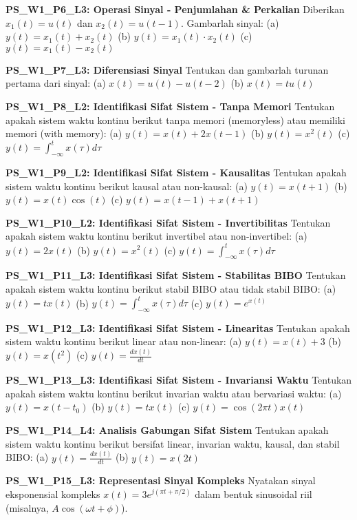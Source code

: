 \documentclass[
  letterpaper,
  DIV=11,
  numbers=noendperiod]{scrreprt}
\begin{document}
\textbf{PS\_W1\_P6\_L3: Operasi Sinyal - Penjumlahan \& Perkalian}
Diberikan \(x_1(t) = u(t)\) dan \(x_2(t) = u(t-1)\). Gambarlah sinyal:
(a) \(y(t) = x_1(t) + x_2(t)\) (b) \(y(t) = x_1(t) \cdot x_2(t)\) (c)
\(y(t) = x_1(t) - x_2(t)\)

\textbf{PS\_W1\_P7\_L3: Diferensiasi Sinyal} Tentukan dan gambarlah
turunan pertama dari sinyal: (a) \(x(t) = u(t) - u(t-2)\) (b)
\(x(t) = t u(t)\)

\textbf{PS\_W1\_P8\_L2: Identifikasi Sifat Sistem - Tanpa Memori}
Tentukan apakah sistem waktu kontinu berikut tanpa memori (memoryless)
atau memiliki memori (with memory): (a) \(y(t) = x(t) + 2x(t-1)\) (b)
\(y(t) = x^2(t)\) (c) \(y(t) = \int_{-\infty}^{t} x(\tau) d\tau\)

\textbf{PS\_W1\_P9\_L2: Identifikasi Sifat Sistem - Kausalitas} Tentukan
apakah sistem waktu kontinu berikut kausal atau non-kausal: (a)
\(y(t) = x(t+1)\) (b) \(y(t) = x(t) \cos(t)\) (c)
\(y(t) = x(t-1) + x(t+1)\)

\textbf{PS\_W1\_P10\_L2: Identifikasi Sifat Sistem - Invertibilitas}
Tentukan apakah sistem waktu kontinu berikut invertibel atau
non-invertibel: (a) \(y(t) = 2x(t)\) (b) \(y(t) = x^2(t)\) (c)
\(y(t) = \int_{-\infty}^{t} x(\tau) d\tau\)

\textbf{PS\_W1\_P11\_L3: Identifikasi Sifat Sistem - Stabilitas BIBO}
Tentukan apakah sistem waktu kontinu berikut stabil BIBO atau tidak
stabil BIBO: (a) \(y(t) = t x(t)\) (b)
\(y(t) = \int_{-\infty}^{t} x(\tau) d\tau\) (c) \(y(t) = e^{x(t)}\)

\textbf{PS\_W1\_P12\_L3: Identifikasi Sifat Sistem - Linearitas}
Tentukan apakah sistem waktu kontinu berikut linear atau non-linear: (a)
\(y(t) = x(t) + 3\) (b) \(y(t) = x(t^2)\) (c)
\(y(t) = \frac{dx(t)}{dt}\)

\textbf{PS\_W1\_P13\_L3: Identifikasi Sifat Sistem - Invariansi Waktu}
Tentukan apakah sistem waktu kontinu berikut invarian waktu atau
bervariasi waktu: (a) \(y(t) = x(t-t_0)\) (b) \(y(t) = t x(t)\) (c)
\(y(t) = \cos(2\pi t) x(t)\)

\textbf{PS\_W1\_P14\_L4: Analisis Gabungan Sifat Sistem} Tentukan apakah
sistem waktu kontinu berikut bersifat linear, invarian waktu, kausal,
dan stabil BIBO: (a) \(y(t) = \frac{dx(t)}{dt}\) (b) \(y(t) = x(2t)\)

\textbf{PS\_W1\_P15\_L3: Representasi Sinyal Kompleks} Nyatakan sinyal
eksponensial kompleks \(x(t) = 3e^{j(\pi t + \pi/2)}\) dalam bentuk
sinusoidal riil (misalnya, \(A \cos(\omega t + \phi)\)).
\end{document}

